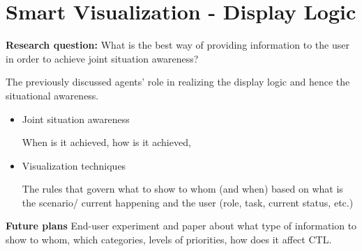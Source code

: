 \chapter{Smart Visualization - Display Logic}

\textbf{Research question:} What is the best way of providing information to the user in order to achieve joint situation awareness? 

The previously discussed agents' role in realizing the display logic and hence the situational awareness.
  \begin{itemize}
  
\item Joint situation awareness

When is it achieved, how is it achieved,

\item Visualization techniques

The rules that govern what to show to whom (and when) based on what is the scenario/ current happening and the user (role, task, current status, etc.) 
\end{itemize}
  
\textbf{Future plans} End-user experiment and paper about what type of information to show to whom, which categories, levels of priorities, how does it affect CTL.
  
  
  
  